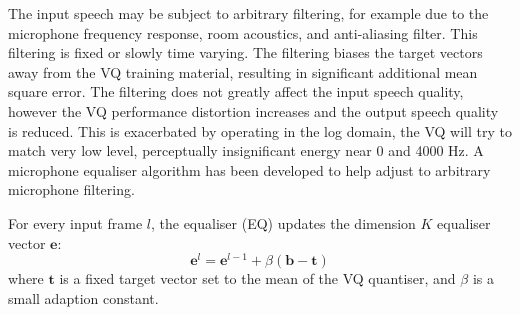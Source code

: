 \documentclass{article}
\begin{document}
{The input speech may be subject to arbitrary filtering, for example due to the microphone frequency response, room acoustics, and anti-aliasing filter.  This filtering is fixed or slowly time varying.  The filtering biases the target vectors away from the VQ training material, resulting in significant additional mean square error.  The filtering does not greatly affect the input speech quality, however the VQ performance distortion increases and the output speech quality is reduced.  This is exacerbated by operating in the log domain, the VQ will try to match very low level, perceptually insignificant energy near 0 and 4000 Hz. A microphone equaliser algorithm has been developed to help adjust to arbitrary microphone filtering.

For every input frame $l$, the equaliser (EQ) updates the dimension $K$ equaliser vector $\mathbf{e}$:
\begin{equation}
\mathbf{e}^{l} = \mathbf{e}^{l-1} + \beta(\mathbf{b} - \mathbf{t})
\end{equation}
where $\mathbf{t}$ is a fixed target vector set to the mean of the VQ quantiser, and $\beta$ is a small adaption constant.

}
\end{document}
